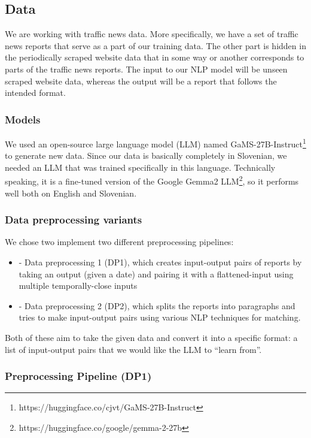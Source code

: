 \subsection*{Data}
We are working with traffic news data.
More specifically, we have a set of traffic news reports that serve as a part of our training data.
The other part is hidden in the periodically scraped website data that in some way or another corresponds to parts of the traffic news reports.
The input to our NLP model will be unseen scraped website data, whereas the output will be a report that follows the intended format.


\subsubsection*{Models}
We used an open-source large language model (LLM) named GaMS-27B-Instruct\footnote{https://huggingface.co/cjvt/GaMS-27B-Instruct} to generate new data.
Since our data is basically completely in Slovenian, we needed an LLM that was trained specifically in this language.
Technically speaking, it is a fine-tuned version of the Google Gemma2 LLM\footnote{https://huggingface.co/google/gemma-2-27b}, so it performs well both on English and Slovenian.

\subsubsection*{Data preprocessing variants}
We chose two implement two different preprocessing pipelines:
\begin{itemize}
    \item - Data preprocessing 1 (DP1), which creates input-output pairs of reports by taking an output (given a date) and pairing it with a flattened-input using multiple temporally-close inputs
    \item - Data preprocessing 2 (DP2), which splits the reports into paragraphs and tries to make input-output pairs using various NLP techniques for matching.
\end{itemize}

Both of these aim to take the given data and convert it into a specific format: a list of input-output pairs that we would like the LLM to ``learn from''.

\subsubsection*{Preprocessing Pipeline (DP1)}

